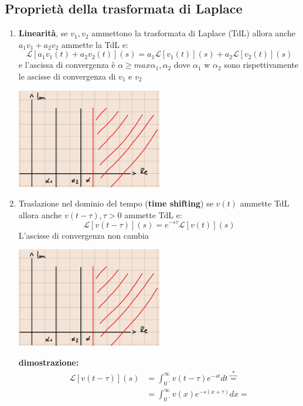 \documentclass[a4paper, 12pt]{book}
\theoremstyle{plain}
\begin{document}
\subsection{Proprietà della trasformata di Laplace}

\begin{enumerate}
    \item \textbf{Linearità}, se $v_1, v_2$ ammettono la trasformata di Laplace (TdL) allora anche $a_1v_1 + a_2v_2$ ammette la TdL e: \[ \mathcal{L} [a_1v_1(t) + a_2v_2(t)] (s) = a_1 \mathcal{L} [v_1(t)] (s) + a_2 \mathcal{L} [v_2(t)] (s) \] e l'ascissa di convergenza è $\alpha \ge max{\alpha_1, \alpha_2}$ dove $\alpha_1$ w $\alpha_2$ sono rispettivamente le ascisse di convergenza di $v_1$ e $v_2$ \begin{center}
        \includegraphics[width=0.5\textwidth]{RdC3.png}
    \end{center}
    \item Traslazione nel dominio del tempo (\textbf{time shifting}) se $v(t)$ ammette TdL allora anche $v(t - \tau), \tau > 0$ ammette TdL e:
    \[
        \mathcal{L} [v(t - \tau)] (s) = e^{-s \tau} \mathcal{L} [v(t)] (s)
    \]
    L'ascisse di convergenza non cambia
    \begin{center}
        \includegraphics[width=0.5\textwidth]{RdC3.png}
    \end{center}
    \textbf{dimostrazione: } 
    \[
        \begin{split}
            \mathcal{L} [v(t - \tau)] (s) &= \int_{0^-}^\infty v(t - \tau) e^{-st} dt \overbrace{=}^* \\
            &= \int_{0^-}^\infty v(x) e^{-s(x + \tau)} dx = \\

\end{split}\]
\end{enumerate}
\end{document}
